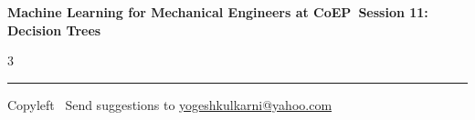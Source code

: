 \documentclass[8pt,landscape]{article}
\begin{document}
\footnotesize

\begin{center}
\Large{\textbf{Machine Learning for Mechanical Engineers at CoEP\ Session 11: Decision Trees}}
\end{center}

\begin{multicols}{3}

\end{multicols}

\rule{\linewidth}{0.25pt}
\scriptsize
Copyleft \textcopyleft\  Send suggestions to
\href{http://www.yogeshkulkarni.com}{yogeshkulkarni@yahoo.com}
\end{document}
